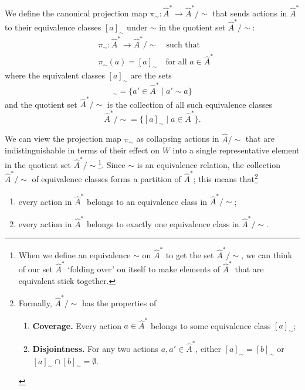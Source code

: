 We define the canonical projection map $\pi_{\sim}: \hat{A}^{\ast} \to \hat{A}^{\ast}/\sim$ that sends actions in $\hat{A}^{\ast}$ to their equivalence classes $[a]_{\sim}$ under $\sim$ in the quotient set $\hat{A}^{\ast}/\sim$:
\begin{equation}
\begin{aligned}
    & \pi_{\sim}: \hat{A}^{\ast} \to \hat{A}^{\ast}/\sim \quad \text{such that} \\
    & \pi_{\sim}(a) = [a]_{\sim} \quad \text{for all $a \in \hat{A}^{*}$}
\end{aligned}
\end{equation}
where the equivalent classes $[a]_{\sim}$ are the sets
\begin{equation}
	[a]_{\sim} = \{ a' \in \hat{A}^{\ast} \mid a' \sim a \}
\end{equation}
and the quotient set $\hat{A}^{*}/\sim$ is the collection of all such equivalence classes
\begin{equation}
    \hat{A}^{*}/\sim = \{ [a]_{\sim} \mid a \in \hat{A}^{*} \}.
\end{equation}

We can view the projection map $\pi_{\sim}$ as collapsing actions in $\hat{A}/\sim$ that are indistinguishable in terms of their effect on $W$ into a single representative element in the quotient set $\hat{A}^{*}/\sim$\footnote{
    When we define an equivalence $\sim$ on $\hat{A}^{\ast}$ to get the set $\hat{A}^{\ast}/\sim$, we can think of our set $\hat{A}^{\ast}$ `folding over' on itself to make elements of $\hat{A}^{\ast}$ that are equivalent stick together.
}.
Since $\sim$ is an equivalence relation, the collection $\hat{A}^{*}/\sim$ of equivalence classes forms a partition of $\hat{A}^{*}$; this means that\footnote{
Formally, $\hat{A}^{*}/\sim$ has the properties of
\begin{enumerate}
    \item \textbf{Coverage.}
    Every action $a \in \hat{A}^{*}$ belongs to some equivalence class $[a]_{\sim}$;

    \item \textbf{Disjointness.}
    For any two actions $a, a' \in \hat{A}^{*}$, either $[a]_{\sim} = [b]_{\sim}$ or $[a]_{\sim} \cap [b]_{\sim} = \emptyset$.
\end{enumerate}
}
\begin{enumerate}
    \item every action in $\hat{A}^{*}$ belongs to an equivalence class in $\hat{A}^{*}/\sim$;
    \item every action in $\hat{A}^{*}$ belongs to exactly one equivalence class in $\hat{A}^{*}/\sim$.
\end{enumerate}

